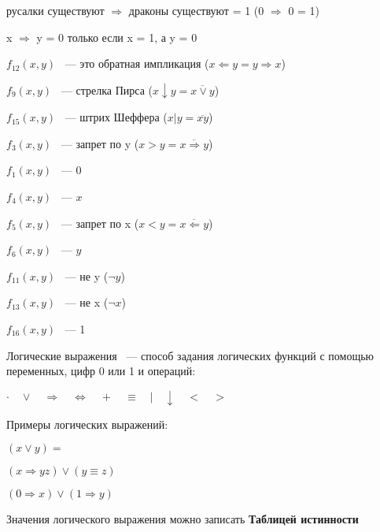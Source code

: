 \documentclass[russian]{lecture-notes}
\begin{document}
\begin{sloppypar}
\begin{example}
            русалки существуют $\Rightarrow$ драконы существуют = 1 (0 $\Rightarrow$ 0 = 1)

            x $\Rightarrow$ y = 0 только если x = 1, а y = 0

            $f_{12}(x,y)$ ~--- это обратная импликация ($x \Leftarrow y = y \Rightarrow x$)

            $f_{9}(x,y)$ ~--- стрелка Пирса ($x \downarrow y = \overline{x \lor y}$)

            $f_{15}(x,y)$ ~--- штрих Шеффера ($x | y = \overline{xy}$)

            $f_{3}(x,y)$ ~--- запрет по y ($x > y = \overline{x \Rightarrow y}$)

            $f_{1}(x,y)$ ~--- 0

            $f_{4}(x,y)$ ~--- $x$

            $f_{5}(x,y)$ ~--- запрет по x ($x < y = \overline{x \Leftarrow y}$)

            $f_{6}(x,y)$ ~--- $y$

            $f_{11}(x,y)$ ~--- не y ($\neg y$)

            $f_{13}(x,y)$ ~--- не x ($\neg x$)

            $f_{16}(x,y)$ ~--- 1

        \end{example}

        \begin{definition}
            Логические выражения ~--- способ задания логических функций с помощью переменных, цифр 0 или 1 и операций:

            $\cdot \quad \lor \quad \Rightarrow \quad  \Leftrightarrow \quad + \quad \equiv \quad | \quad \downarrow \quad < \quad >$
        \end{definition}

        \begin{example}
            Примеры логических выражений:

            $(x \lor y) = $

            $(x \Rightarrow yz) \lor (y \equiv z)$

            $(0 \Rightarrow x) \lor (1 \Rightarrow y)$
        \end{example}

        \begin{definition}
            Значения логического выражения можно записать \textbf{Таблицей истинности}
        \end{definition}


\end{sloppypar}
\end{document}
